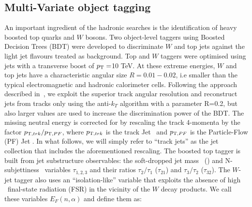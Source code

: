 \subsection{Multi-Variate object tagging}
\label{subsec:mvatagger}

An important ingredient of the hadronic searches is the identification of heavy boosted top quarks and $W$ bosons. Two object-level taggers using Boosted Decision Trees (BDT) were developed to discriminate $W$ and top jets against the light jet flavours treated as background.
Top and $W$ taggers were optimised using jets with a transverse boost of $p_{\text{T}}=$10 TeV. At these extreme energies, $W$ and top jets have a characteristic angular size $R=0.01-0.02$, i.e smaller than the typical electromagnetic and hadronic calorimeter cells. Following the approach described in~\cite{Larkoski:2015yqa}, we exploit the superior track angular resolution and reconstruct jets from tracks only using the anti-$k_T$ algorithm with a parameter R=0.2, but also larger values are used to increase the discrimination power of the BDT. The missing neutral energy is corrected for by rescaling the track 4-momenta by the factor $p_{\text{T} ,trk}/p_{\text{T} ,PF}$, where $p_{\text{T} ,trk}$ is the track Jet \pt\ and $p_{\text{T} ,PF}$ is the Particle-Flow (PF) Jet \pt. In what follows, we will simply refer to ``track jets'' as the jet collection that includes the aforementioned rescaling. The boosted top tagger is built from jet substructure observables: the soft-dropped jet mass~\cite{Larkoski:2014wba} (\mSD) and N-subjettiness~\cite{Thaler:2010tr} variables $\tau_{1,2,3}$ and their ratios $\tau_{2}/\tau_{1}$ ($\tau_{21}$) and $\tau_{3}/\tau_{2}$ ($\tau_{32}$). The $W$-jet tagger also uses an ``isolation-like'' variable that exploits the absence of high \pt\ final-state radiation (FSR) in the vicinity of the $W$ decay products. We call these variables $E_{F}(n,\alpha)$ and define them as:



